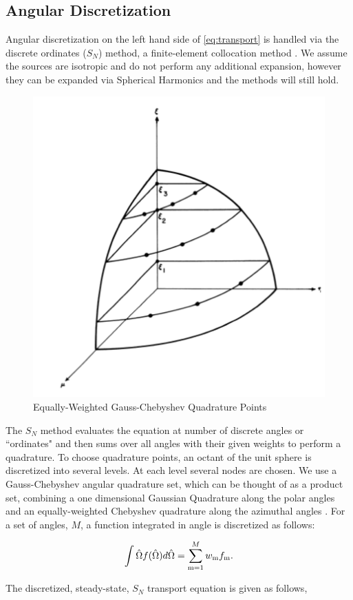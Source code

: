 \subsection{Angular Discretization}

Angular discretization on the left hand side of \eqref{eq:transport} is handled via the discrete ordinates ($S_N$) method, a finite-element collocation method \cite{Lathrop1965}. We assume the sources are isotropic and do not perform any additional expansion, however they can be expanded via Spherical Harmonics and the methods will still hold. 

\begin{figure}[H]
    \centering
    \includegraphics[width=.5\textwidth]{fig/SNPoints.png}
    \caption{Equally-Weighted Gauss-Chebyshev Quadrature Points \cite{Lathrop1965}}
    \label{fig:SN}
\end{figure}

The $S_N$ method evaluates the equation at number of discrete angles or ``ordinates" and then sums over all angles with their given weights to perform a quadrature. To choose quadrature points, an octant of the unit sphere is discretized into several levels. At each level several nodes are chosen. We use a Gauss-Chebyshev angular quadrature set, which can be thought of as a product set, combining a one dimensional Gaussian Quadrature along the polar angles and an equally-weighted Chebyshev quadrature along the azimuthal angles \cite{jarrel-thesis}. For a set of angles, $M$, a function integrated in angle is discretized as follows:

\begin{equation}
\int \hat{\Omega} f(\hat{\Omega}) d \hat{\Omega} = \sum\limits_{\mathrm{m}=1}^{M} w_{\mathrm{m}} f_{\mathrm{m}}.    
\end{equation}


The discretized, steady-state, $S_N$ transport equation is given as follows,

